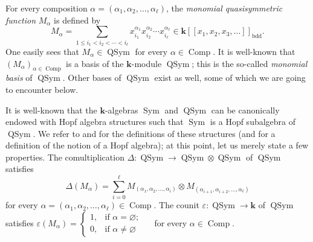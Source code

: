 \documentclass[numbers=enddot,12pt,final,onecolumn,notitlepage,abstracton]{scrartcl}%
\theoremstyle{definition}
\let\sumnonlimits\sum
\renewcommand{\sum}{\sumnonlimits\limits}
\begin{document}
For every composition $\alpha=\left(  \alpha_{1},\alpha_{2},\ldots
,\alpha_{\ell}\right)  $, the \textit{monomial quasisymmetric function}
$M_{\alpha}$ is defined by%
\[
M_{\alpha}=\sum_{1\leq i_{1}<i_{2}<\cdots<i_{\ell}}x_{i_{1}}^{\alpha_{1}%
}x_{i_{2}}^{\alpha_{2}}\cdots x_{i_{\ell}}^{\alpha_{\ell}}\in\mathbf{k}\left[
\left[  x_{1},x_{2},x_{3},\ldots\right]  \right]  _{\operatorname*{bdd}}.
\]
One easily sees that $M_{\alpha}\in\operatorname*{QSym}$ for every $\alpha
\in\operatorname*{Comp}$. It is well-known that $\left(  M_{\alpha}\right)
_{\alpha\in\operatorname*{Comp}}$ is a basis of the $\mathbf{k}$-module
$\operatorname*{QSym}$; this is the so-called \textit{monomial basis} of
$\operatorname*{QSym}$. Other bases of $\operatorname*{QSym}$ exist as well,
some of which we are going to encounter below.

It is well-known that the $\mathbf{k}$-algebras $\operatorname*{Sym}$ and
$\operatorname*{QSym}$ can be canonically endowed with Hopf algebra structures
such that $\operatorname*{Sym}$ is a Hopf subalgebra of $\operatorname*{QSym}%
$. We refer to \cite[Chapters 4 and 6]{HGK} and \cite[Chapters 2 and
5]{Reiner} for the definitions of these structures (and for a definition of
the notion of a Hopf algebra); at this point, let us merely state a few
properties. The comultiplication $\Delta:\operatorname*{QSym}\rightarrow
\operatorname*{QSym}\otimes\operatorname*{QSym}$ of $\operatorname*{QSym}$
satisfies%
\[
\Delta\left(  M_{\alpha}\right)  =\sum_{i=0}^{\ell}M_{\left(  \alpha
_{1},\alpha_{2},\ldots,\alpha_{i}\right)  }\otimes M_{\left(  \alpha
_{i+1},\alpha_{i+2},\ldots,\alpha_{\ell}\right)  }%
\]
for every $\alpha=\left(  \alpha_{1},\alpha_{2},\ldots,\alpha_{\ell}\right)
\in\operatorname*{Comp}$. The counit $\varepsilon:\operatorname*{QSym}%
\rightarrow\mathbf{k}$ of $\operatorname*{QSym}$ satisfies $\varepsilon\left(
M_{\alpha}\right)  =
\begin{cases}
1, & \text{if }\alpha=\varnothing;\\
0, & \text{if }\alpha\neq\varnothing
\end{cases}
\quad$ for every $\alpha\in\operatorname*{Comp}$.
\end{document}
